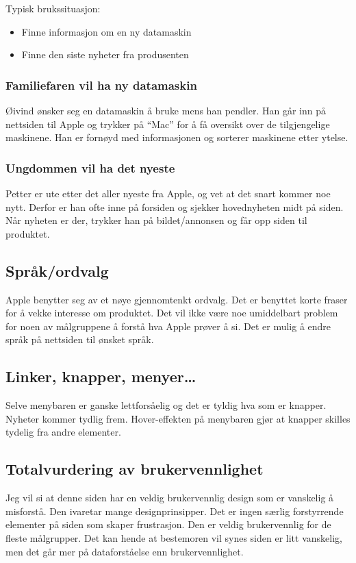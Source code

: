 Typisk brukssituasjon: 

\begin{itemize}
\item Finne informasjon om en ny datamaskin
\item Finne den siste nyheter fra produsenten
\end{itemize}

\subsubsection{Familiefaren vil ha ny datamaskin}

Øivind ønsker seg en datamaskin å bruke mens han pendler. Han går inn på nettsiden til Apple og trykker på ``Mac'' for å få oversikt over de tilgjengelige maskinene. Han er fornøyd med informasjonen og sorterer maskinene etter ytelse. 

\subsubsection{Ungdommen vil ha det nyeste}

Petter er ute etter det aller nyeste fra Apple, og vet at det snart kommer noe nytt. Derfor er han ofte inne på forsiden og sjekker hovednyheten midt på siden. Når nyheten er der, trykker han på bildet/annonsen og får opp siden til produktet. 

\subsection{Språk/ordvalg}

Apple benytter seg av et nøye gjennomtenkt ordvalg. Det er benyttet korte fraser for å vekke interesse om produktet. Det vil ikke være noe umiddelbart problem for noen av målgruppene å forstå hva Apple prøver å si. Det er mulig å endre språk på nettsiden til ønsket språk. 

\subsection{Linker, knapper, menyer\dots}

Selve menybaren er ganske lettforsåelig og det er tyldig hva som er knapper. Nyheter kommer tydlig frem. Hover-effekten på menybaren gjør at knapper skilles tydelig fra andre elementer. 


\subsection{Totalvurdering av brukervennlighet}

Jeg vil si at denne siden har en veldig brukervennlig design som er vanskelig å misforstå. Den ivaretar mange designprinsipper. Det er ingen særlig forstyrrende elementer på siden som skaper frustrasjon. Den er veldig brukervennlig for de fleste målgrupper. Det kan hende at bestemoren vil synes siden er litt vanskelig, men det går mer på dataforståelse enn brukervennlighet. 